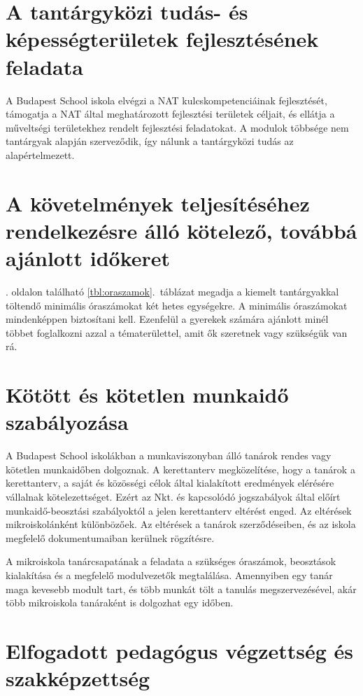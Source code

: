 \section{A tantárgyközi tudás- és képességterületek fejlesztésének feladata}

A Budapest School iskola elvégzi a NAT kulcskompetenciáinak fejlesztését, támogatja a NAT által meghatározott fejlesztési területek céljait, és ellátja a műveltségi területekhez rendelt fejlesztési feladatokat. A modulok többsége nem tantárgyak alapján szerveződik, így nálunk a tantárgyközi tudás az alapértelmezett.

\section[Kötelező és ajánlott időkeret]{A követelmények teljesítéséhez rendelkezésre álló kötelező, továbbá ajánlott időkeret}

. oldalon található \ref{tbl:oraszamok}.~táblázat
megadja a kiemelt tantárgyakkal töltendő minimális óraszámokat két hetes egységekre. A minimális óraszámokat mindenképpen biztosítani kell. 
Ezenfelül a gyerekek számára ajánlott minél többet foglalkozni azzal a tématerülettel, amit ők szeretnek vagy szükségük van rá.

\section{Kötött és kötetlen munkaidő szabályozása}

A Budapest School iskolákban a munkaviszonyban álló tanárok rendes vagy kötetlen munkaidőben dolgoznak.
A kerettanterv megközelítése, hogy a tanárok a kerettanterv, a saját és közösségi célok által kialakított eredmények elérésére vállalnak kötelezettséget. Ezért az Nkt. és kapcsolódó jogszabályok által előírt munkaidő-beosztási szabályoktól a jelen kerettanterv eltérést enged. Az eltérések mikroiskolánként különbözőek. Az eltérések a tanárok szerződéseiben, és az iskola megfelelő dokumentumaiban kerülnek rögzítésre.

A mikroiskola tanárcsapatának a feladata a szükséges óraszámok, beosztások kialakítása és a megfelelő modulvezetők megtalálása. Amennyiben egy tanár maga kevesebb modult tart, és több munkát tölt a tanulás megszervezésével, akár több mikroiskola tanáraként is dolgozhat egy időben.

\section{Elfogadott pedagógus végzettség és szakképzettség}

